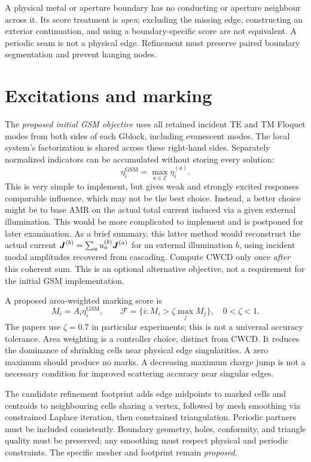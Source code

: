 A physical metal or aperture boundary has no conducting or aperture neighbour
across it. Its score treatment is \emph{open}; excluding the missing edge,
constructing an exterior continuation, and using a boundary-specific score are
not equivalent. A periodic seam is not a physical edge. Refinement must preserve
paired boundary segmentation and prevent hanging nodes.

\section{Excitations and marking}
The \emph{proposed initial GSM objective} uses all retained incident TE and TM
Floquet modes from both sides of each Gblock, including evanescent modes.
The local system's factorization is shared across these right-hand sides.
Separately normalized indicators can be accumulated without storing every
solution:
\begin{equation}
 \eta_i^{\text{GSM}}=\max_{a\in\mathcal E}\eta_i^{(a)}.
 \label{eq:amr-mode-maximum}
\end{equation}
This is very simple to implement, but gives weak and strongly excited responses comparable influence,
which may not be the best choice.  Instead, a better choice might be to base AMR on the actual total current induced via a given external illumination.
This would be more complicated to implement and is postponed for later examination.
As a brief summary, this latter method would reconstruct the actual current
$\boldsymbol{J}^{(b)}=\sum_a u_a^{(b)} \boldsymbol{J}^{(a)}$ for an external illumination
$b$, using incident modal amplitudes recovered from cascading. Compute CWCD
only once \emph{after} this coherent sum.
This is an optional alternative objective, not a requirement for
the initial GSM implementation.

A proposed area-weighted marking score is
\begin{equation}
 M_i = A_i\eta_i^{\text{GSM}}, \qquad  \mathcal F = \{i: M_i> \zeta\max_j M_j\}, \quad 0 < \zeta < 1.
 \label{eq:amr-marking}
\end{equation}
The papers use $\zeta=0.7$ in particular experiments; this is not a universal
accuracy tolerance. Area weighting is a controller choice, distinct from CWCD.
It reduces the dominance of shrinking cells near physical edge singularities.
A zero maximum should produce no marks. A decreasing maximum charge jump is not
a necessary condition for improved scattering accuracy near singular edges.

The candidate refinement footprint adds edge midpoints to marked cells and
centroids to neighbouring cells sharing a vertex, followed by mesh smoothing via
constrained Laplace iteration, then constrained triangulation.  Periodic partners must be
included consistently. Boundary geometry, holes, conformity, and triangle quality
must be preserved; any smoothing must respect physical and periodic constraints.
The specific mesher and footprint remain \emph{proposed}. 

